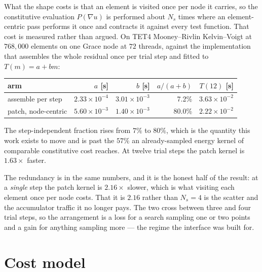 \documentclass[11pt]{article}
\begin{document}
What the shape costs is that an element is visited once per node it carries, so
the constitutive evaluation $P(\nabla u)$ is performed about $N_s$ times where an
element-centric pass performs it once and contracts it against every test
function.  That cost is measured rather than argued.  On TET4 Mooney--Rivlin
Kelvin--Voigt at $768{,}000$ elements on one Grace node at $72$ threads, against
the implementation that assembles the whole residual once per trial step and
fitted to $T(m)=a+bm$:

\begin{center}
\begin{tabular}{lrrrr}
\toprule
arm & $a$ [s] & $b$ [s] & $a/(a{+}b)$ & $T(12)$ [s] \\
\midrule
assemble per step   & $2.33\times10^{-4}$ & $3.01\times10^{-3}$ & 7.2\%  & $3.63\times10^{-2}$ \\
patch, node-centric & $5.60\times10^{-3}$ & $1.40\times10^{-3}$ & 80.0\% & $2.22\times10^{-2}$ \\
\bottomrule
\end{tabular}
\end{center}

The step-independent fraction rises from $7\%$ to $80\%$, which is the quantity
this work exists to move and is past the $57\%$ an already-sampled energy kernel
of comparable constitutive cost reaches.  At twelve trial steps the patch kernel
is $1.63\times$ faster.

The redundancy is in the same numbers, and it is the honest half of the result:
at a \emph{single} step the patch kernel is $2.16\times$ slower, which is what
visiting each element once per node costs.  That it is $2.16$ rather than
$N_s=4$ is the scatter and the accumulator traffic it no longer pays.  The two
cross between three and four trial steps, so the arrangement is a loss for a
search sampling one or two points and a gain for anything sampling more --- the
regime the interface was built for.

\section{Cost model}
\end{document}
